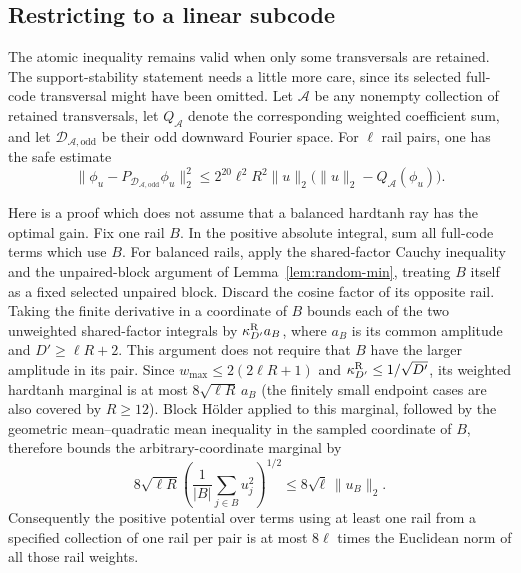 \subsection{Restricting to a linear subcode}
\label{sec:retained-stability}
The atomic inequality remains valid when only some transversals are
retained. The support-stability statement needs a little more care,
since its selected full-code transversal might have been omitted.
Let $\mathcal A$ be any nonempty collection of retained transversals,
let $Q_{\mathcal A}$ denote the corresponding weighted coefficient sum,
and let $\mathcal D_{\mathcal A,\mathrm{odd}}$ be their odd downward
Fourier space. For $\ell$ rail pairs, one has the safe estimate
\begin{equation}\label{eq:retained-stability}
 \|\phi_u-P_{\mathcal D_{\mathcal A,\mathrm{odd}}}\phi_u\|_2^2
 \le 2^{20}\ell^2R^2\|u\|_2
       \bigl(\|u\|_2-Q_{\mathcal A}(\phi_u)\bigr).
\end{equation}

Here is a proof which does not assume that a balanced hardtanh ray
has the optimal gain. Fix one rail $B$. In the positive absolute
integral, sum all full-code terms which use $B$. For balanced rails,
apply the shared-factor Cauchy inequality and the unpaired-block
argument of Lemma~\ref{lem:random-min}, treating $B$ itself as a fixed
selected unpaired block. Discard the cosine factor of its opposite
rail. Taking the finite derivative in a coordinate of $B$ bounds each
of the two unweighted shared-factor integrals by
$\kappa_{D'}^{\rm R}a_B$, where $a_B$ is its common amplitude and
$D'\ge\ell R+2$. This argument does not require that $B$ have the
larger amplitude in its pair. Since
$w_{\max}\le2(2\ell R+1)$ and
$\kappa_{D'}^{\rm R}\le1/\sqrt{D'}$, its weighted hardtanh
marginal is at most $8\sqrt{\ell R}\,a_B$ (the finitely small
endpoint cases are also covered by $R\ge12$).
Block H\"older applied to this marginal, followed by the geometric
mean--quadratic mean inequality in the sampled coordinate of $B$,
therefore bounds the arbitrary-coordinate marginal by
\[
 8\sqrt{\ell R}\left(\frac1{|B|}\sum_{j\in B}u_j^2\right)^{1/2}
 \le8\sqrt\ell\,\|u_B\|_2.
\]
Consequently the positive potential over terms using at least one
rail from a specified collection of one rail per pair is at most
$8\ell$ times the Euclidean norm of all those rail weights.

